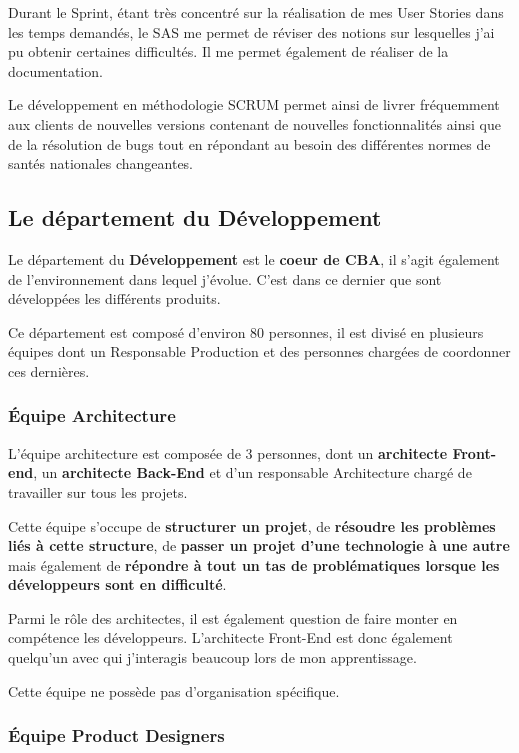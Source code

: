 \documentclass{article}
\begin{document}
Durant le Sprint, étant très concentré sur la réalisation de mes User Stories dans les temps demandés, le SAS me permet de réviser des notions sur lesquelles j'ai pu obtenir certaines difficultés. Il me permet également de réaliser de la documentation.

Le développement en méthodologie SCRUM permet ainsi de livrer fréquemment aux clients de nouvelles versions contenant de nouvelles fonctionnalités ainsi que de la résolution de bugs tout en répondant au besoin des différentes normes de santés nationales changeantes.

\newpage

\subsection{Le département du Développement}

Le département du \textbf{Développement} est le \textbf{coeur de CBA}, il s'agit également de l'environnement dans lequel j'évolue. C'est dans ce dernier que sont développées les différents produits.

Ce département est composé d'environ 80 personnes, il est divisé en plusieurs équipes dont un Responsable Production et des personnes chargées de coordonner ces dernières.

\subsubsection{Équipe Architecture}

L'équipe architecture est composée de 3 personnes, dont un \textbf{architecte Front-end}, un \textbf{architecte Back-End} et d'un responsable Architecture chargé de travailler sur tous les projets.

Cette équipe s'occupe de \textbf{structurer un projet}, de \textbf{résoudre les problèmes liés à cette structure}, de \textbf{passer un projet d'une technologie à une autre} mais également de \textbf{répondre à tout un tas de problématiques lorsque les développeurs sont en difficulté}.

Parmi le rôle des architectes, il est également question de faire monter en compétence les développeurs. L'architecte Front-End est donc également quelqu'un avec qui j'interagis beaucoup lors de mon apprentissage.

Cette équipe ne possède pas d'organisation spécifique.

\subsubsection{Équipe Product Designers}
\end{document}
